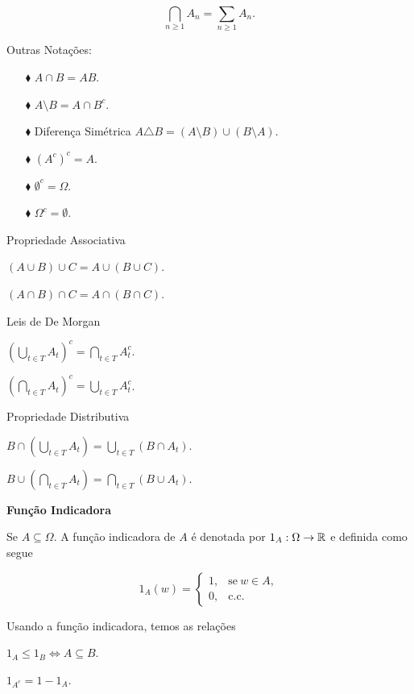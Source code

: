 $$
	\displaystyle\bigcap_{n \geqslant 1}{A_n} = \sum_{n \geqslant 1} A_n.	
$$

Outras Notações:

\begin{enumerate}
\item[$\blacklozenge$] $ A \cap B = AB$.
\item[$\blacklozenge$] $A \setminus B = A \cap B^c$.
\item[$\blacklozenge$] Diferença Simétrica $A\triangle B = (A \setminus B) \cup (B\setminus A).$
\item[$\blacklozenge$] $(A^c)^c = A $.
\item[$\blacklozenge$] $\emptyset^c = \Omega$.
\item[$\blacklozenge$] $\Omega^c = \emptyset$.
\end{enumerate}

Propriedade Associativa

$(A\cup B)\cup C= A \cup ( B \cup C)$.

$(A\cap B)\cap C= A \cap ( B \cap C)$.

\vspace*{1cm}
Leis de De Morgan

$\left( \displaystyle\bigcup_{t \in T}{A_t} \right)^c = \displaystyle\bigcap_{t \in T}{A_t^c}$.

$\left( \displaystyle\bigcap_{t \in T}{A_t} \right)^c = \displaystyle\bigcup_{t \in T}{A_t^c}$.


\vspace*{1cm}
Propriedade Distributiva

$B \cap \left( \displaystyle\bigcup_{t \in T}{A_t} \right) = \displaystyle\bigcup_{t \in T}{(B\cap A_t)} $.

$B \cup \left( \displaystyle\bigcap_{t \in T}{A_t} \right) = \displaystyle\bigcap_{t \in T}{(B\cup A_t)} $.

\vspace*{1cm}
\textbf{Função Indicadora}

Se $A \subseteq \Omega$. A função indicadora de $A$ é denotada por $1_A: \Omega \to \mathbb{R}$ e definida 
como segue

$$
	1_A(w) =
	\begin{cases}
		1, & \text{se}\ w \in A, \\
		0, & \text{c.c.}
	\end{cases}
$$

\begin{observacao} Usando a função indicadora, temos as relações

$1_A \leqslant 1_B \Leftrightarrow A \subseteq B$.

$1_{A^c}= 1- 1_A$.
\end{observacao}


